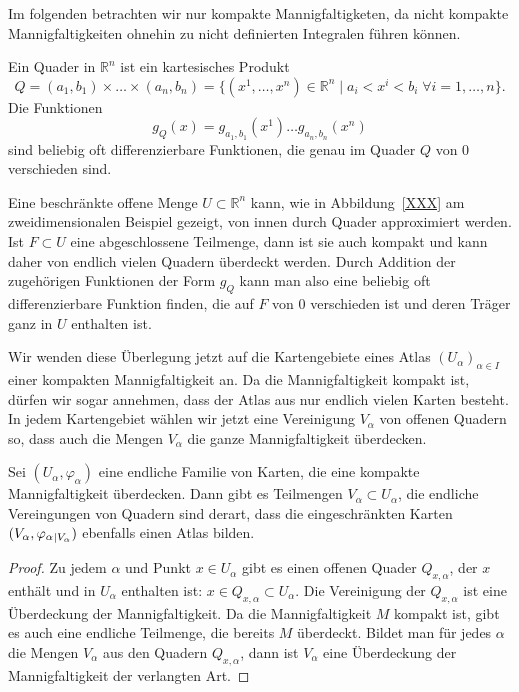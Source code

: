 Im folgenden betrachten wir nur kompakte Mannigfaltigketen, da nicht
kompakte Mannigfaltigkeiten ohnehin zu nicht definierten Integralen
führen können.

Ein Quader in $\mathbb{R}^n$ ist ein kartesisches Produkt
\[
Q
=
(a_1,b_1)
\times\dots\times
(a_n,b_n)
=
\{
(x^1,\dots,x^n)\in\mathbb{R}^n
\mid
a_i < x^i < b_i
\;\forall i=1,\dots,n
\}.
\]
Die Funktionen
\[
g_Q(x)
=
g_{a_1,b_1}(x^1)\dots g_{a_n,b_n}(x^n)
\]
sind beliebig oft differenzierbare Funktionen, die genau im Quader
$Q$ von $0$ verschieden sind.

Eine beschränkte offene Menge $U\subset\mathbb{R}^n$ kann, wie in
Abbildung~\ref{XXX} am zweidimensionalen Beispiel gezeigt,
von innen durch Quader approximiert werden.
Ist $F\subset U$ eine abgeschlossene Teilmenge, dann ist sie auch
kompakt und kann daher von endlich vielen Quadern überdeckt werden.
Durch Addition der zugehörigen Funktionen der Form $g_Q$ kann man also
eine beliebig oft differenzierbare Funktion finden, die auf $F$ von
$0$ verschieden ist und deren Träger ganz in $U$ enthalten ist.

Wir wenden diese Überlegung jetzt auf die Kartengebiete eines
Atlas $(U_\alpha)_{\alpha\in I}$ einer kompakten Mannigfaltigkeit an.
Da die Mannigfaltigkeit kompakt ist, dürfen wir sogar annehmen, dass
der Atlas aus nur endlich vielen Karten besteht.
In jedem Kartengebiet wählen wir jetzt eine Vereinigung $V_\alpha$
von offenen Quadern so, dass auch die Mengen $V_\alpha$ die ganze
Mannigfaltigkeit überdecken.

\begin{satz}
Sei $(U_\alpha,\varphi_\alpha)$ eine endliche Familie von Karten,
die eine kompakte Mannigfaltigkeit überdecken.
Dann gibt es Teilmengen $V_\alpha\subset U_\alpha$, die endliche
Vereingungen von Quadern sind derart, dass die eingeschränkten Karten
$(V_\alpha,\varphi_\alpha\mathstrut_{|V_\alpha})$ ebenfalls einen Atlas
bilden.
\end{satz}

\begin{proof}
Zu jedem $\alpha$ und Punkt $x\in U_\alpha$ gibt es einen offenen
Quader $Q_{x,\alpha}$, der $x$ enthält und in $U_\alpha$ enthalten
ist: $x\in Q_{x,\alpha}\subset U_\alpha$.
Die Vereinigung der $Q_{x,\alpha}$ ist eine Überdeckung der
Mannigfaltigkeit.
Da die Mannigfaltigkeit $M$ kompakt ist, gibt es auch eine endliche 
Teilmenge, die bereits $M$ überdeckt.
Bildet man für jedes $\alpha$ die Mengen $V_\alpha$ aus den Quadern
$Q_{x,\alpha}$, dann ist $V_\alpha$ eine Überdeckung der Mannigfaltigkeit
der verlangten Art.
\end{proof}


